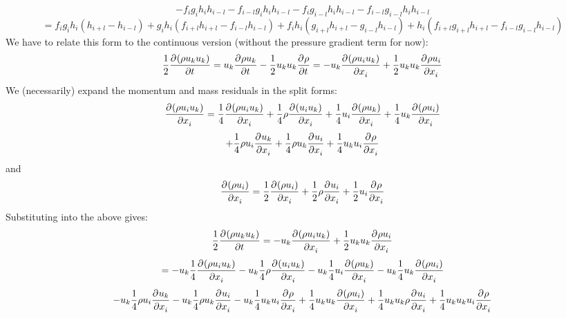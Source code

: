 \documentclass[12pt]{article}
\numberwithin{equation}{section}
\numberwithin{figure}{section}
\begin{document}
\begin{equation*}
- f_{i}g_{i}h_{i}h_{i-l} - f_{i-l}g_{i}h_{i}h_{i-l} - f_{i}g_{i-l}h_{i}h_{i-l} - f_{i-l}g_{i-l}h_{i}h_{i-l}
\end{equation*}
\begin{equation}
=f_{i}g_{i}h_{i}(h_{i+l} - h_{i-l}) + g_{i}h_{i}(f_{i+l}h_{i+l} - f_{i-l}h_{i-l}) + f_{i}h_{i}(g_{i+l}h_{i+l} - g_{i-l}h_{i-l})
+ h_{i}(f_{i+l}g_{i+l}h_{i+l} - f_{i-l}g_{i-l}h_{i-l})
\end{equation}
We have to relate this form to the continuous version (without the pressure gradient term for now):
\begin{equation}\label{eq::kinet_anal}
\frac{1}{2}\frac{\partial^{} (\rho u_ku_k)}{\partial t^{}} = u_k\frac{\partial^{} \rho u_k}{\partial t^{}} - \frac{1}{2}u_ku_k\frac{\partial^{} \rho}{\partial t^{}}
= -u_k\frac{\partial^{} (\rho u_i u_k)}{\partial x_i^{}} + \frac{1}{2}u_ku_k\frac{\partial^{} \rho u_i}{\partial x_i^{}}
\end{equation}
We (necessarily) expand the momentum and mass residuals in the split forms:
\begin{equation*}
\frac{\partial^{} (\rho u_i u_k)}{\partial x_i^{}} = \frac{1}{4}\frac{\partial^{} (\rho u_i u_k)}{\partial x_i^{}} + \frac{1}{4}\rho\frac{\partial^{} (u_iu_k)}{\partial x_i^{}}
 + \frac{1}{4}u_i\frac{\partial^{} (\rho u_k)}{\partial x_i^{}}
  + \frac{1}{4}u_k\frac{\partial^{} (\rho u_i)}{\partial x_i^{}}
\end{equation*}
\begin{equation}
+ \frac{1}{4}\rho u_i \frac{\partial^{} u_k}{\partial x_i^{}}
+ \frac{1}{4}\rho u_k \frac{\partial^{} u_i}{\partial x_i^{}}
+ \frac{1}{4}u_k u_i \frac{\partial^{} \rho}{\partial x_i^{}}
\end{equation}
and
\begin{equation}
\frac{\partial^{} (\rho u_i)}{\partial x_i^{}} = \frac{1}{2}\frac{\partial^{} (\rho u_i)}{\partial x_i^{}} + \frac{1}{2}\rho \frac{\partial^{} u_i}{\partial x_i^{}} + \frac{1}{2}u_i \frac{\partial^{} \rho}{\partial x_i^{}}
\end{equation}
Substituting into the above gives:
\begin{equation*}
\frac{1}{2}\frac{\partial^{} (\rho u_ku_k)}{\partial t^{}} = -u_k\frac{\partial^{} (\rho u_i u_k)}{\partial x_i^{}} + \frac{1}{2}u_ku_k\frac{\partial^{} \rho u_i}{\partial x_i^{}}
\end{equation*}
\begin{equation*}
= -u_k\frac{1}{4}\frac{\partial^{} (\rho u_i u_k)}{\partial x_i^{}} -u_k\frac{1}{4}\rho\frac{\partial^{} (u_iu_k)}{\partial x_i^{}}
 -u_k\frac{1}{4}u_i\frac{\partial^{} (\rho u_k)}{\partial x_i^{}}
  -u_k\frac{1}{4}u_k\frac{\partial^{} (\rho u_i)}{\partial x_i^{}}
\end{equation*}
\begin{equation*}
-u_k\frac{1}{4}\rho u_i \frac{\partial^{} u_k}{\partial x_i^{}}
-u_k\frac{1}{4}\rho u_k \frac{\partial^{} u_i}{\partial x_i^{}}
-u_k\frac{1}{4}u_k u_i \frac{\partial^{} \rho}{\partial x_i^{}}
+ \frac{1}{4}u_ku_k\frac{\partial^{} (\rho u_i)}{\partial x_i^{}} + \frac{1}{4}u_ku_k\rho \frac{\partial^{} u_i}{\partial x_i^{}} + \frac{1}{4}u_ku_ku_i \frac{\partial^{} \rho}{\partial x_i^{}}
\end{equation*}
\end{document}
